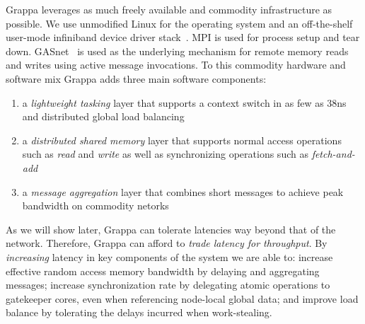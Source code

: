 Grappa leverages as much freely available and commodity infrastructure as
possible. We use unmodified Linux for the operating system and an
off-the-shelf user-mode infiniband device driver stack~\cite{OFED}. MPI is
used for process setup and tear down. GASnet~\cite{gasnet} is used as the
underlying mechanism for remote memory reads and writes using active message
invocations. To this commodity hardware and software mix Grappa adds three
main software components: 
\begin{enumerate}
\item a \emph{lightweight tasking\/} layer that supports
a context switch in as few as 38ns and distributed global load balancing
\item a \emph{distributed shared memory\/} layer that supports normal access operations
such as \emph{read\/} and \emph{write\/} as well as synchronizing operations such as \emph{fetch-and-add\/}~\cite{fetchandadd}
\item a \emph{message aggregation\/} layer that combines short messages to achieve peak bandwidth on commodity netorks
\end{enumerate}
As we will show later, Grappa can tolerate latencies way beyond that of
the network. Therefore, Grappa can afford to \emph{trade latency for
throughput}. By {\em increasing\/} latency in key components of the system we
are able to: increase effective random access memory bandwidth by delaying and aggregating messages; increase synchronization rate 
by delegating atomic operations to gatekeeper cores, even when referencing node-local global data; and improve load balance by tolerating the delays incurred when work-stealing.

% 
% 

